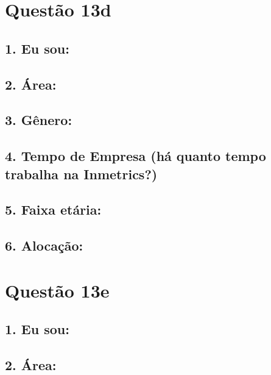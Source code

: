 \documentclass[]{book}
\begin{document}
\hypertarget{questao-13d}{%
\section{Questão 13d}\label{questao-13d}}

\hypertarget{eu-sou-20}{%
\subsection{1. Eu sou:}\label{eu-sou-20}}

\hypertarget{area-20}{%
\subsection{2. Área:}\label{area-20}}

\hypertarget{genero-20}{%
\subsection{3. Gênero:}\label{genero-20}}

\hypertarget{tempo-de-empresa-ha-quanto-tempo-trabalha-na-inmetrics-20}{%
\subsection{4. Tempo de Empresa (há quanto tempo trabalha na Inmetrics?)}\label{tempo-de-empresa-ha-quanto-tempo-trabalha-na-inmetrics-20}}

\hypertarget{faixa-etaria-20}{%
\subsection{5. Faixa etária:}\label{faixa-etaria-20}}

\hypertarget{alocacao-20}{%
\subsection{6. Alocação:}\label{alocacao-20}}

\hypertarget{questao-13e}{%
\section{Questão 13e}\label{questao-13e}}

\hypertarget{eu-sou-21}{%
\subsection{1. Eu sou:}\label{eu-sou-21}}

\hypertarget{area-21}{%
\subsection{2. Área:}\label{area-21}}
\end{document}
